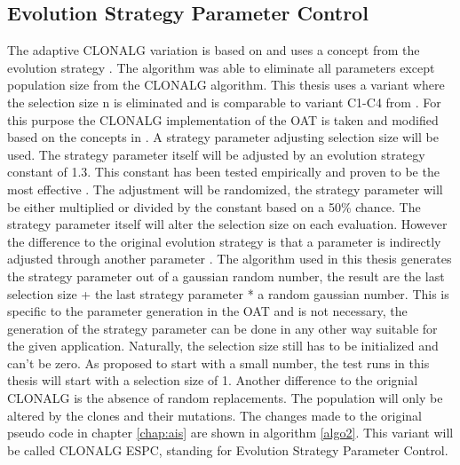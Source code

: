 \subsection{Evolution Strategy Parameter Control}
\label{espc}
The adaptive CLONALG variation is based on \cite{Garret04} and uses a concept from the evolution strategy \cite{evolution}. The algorithm was able to eliminate all parameters except population size from the CLONALG algorithm. This thesis uses a variant where the selection size n is eliminated and is comparable to variant C1-C4 from \cite[p. 1054]{Garret04}. For this purpose the CLONALG implementation of the OAT is taken and modified based on the concepts in \cite{Garret04}. A strategy parameter adjusting selection size will be used. The strategy parameter itself will be adjusted by an evolution strategy constant of 1.3. This constant has been tested empirically and proven to be the most effective \cite{Garret04}. The adjustment will be randomized, the strategy parameter will be either multiplied or divided by the constant based on a 50\% chance. The strategy parameter itself will alter the selection size on each evaluation. However the difference to the original evolution strategy is that a parameter is indirectly adjusted through another parameter \cite{Garret04}. The algorithm used in this thesis generates the strategy parameter out of a gaussian random number, the result are the last selection size + the last strategy parameter * a random gaussian number. This is specific to the parameter generation in the OAT and is not necessary, the generation of the strategy parameter can be done in any other way suitable for the given application.  Naturally, the selection size still has to be initialized and can't be zero. As \cite{Garret04} proposed to start with a small number, the test runs in this thesis will start with a selection size of 1. Another difference to the orignial CLONALG is the absence of random replacements. The population will only be altered by the clones and their mutations. The changes made to the original pseudo code in chapter \ref{chap:ais} are shown in algorithm \ref{algo2}. This variant will be called CLONALG ESPC, standing for Evolution Strategy Parameter Control.\\\\
